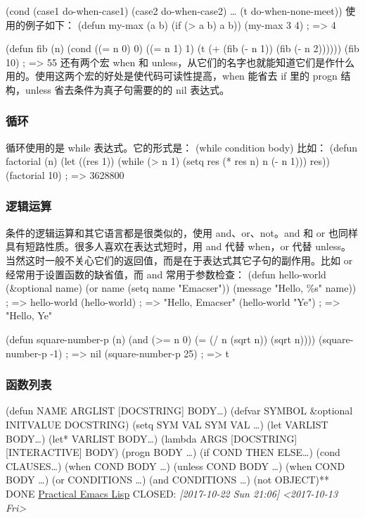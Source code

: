 \documentclass[11pt]{ctexart}
\begin{document}
{{{{(cond (case1 do-when-case1)
(case2 do-when-case2)
\ldots{}
(t do-when-none-meet))
使用的例子如下：
(defun my-max (a b)
(if (> a b)
a b))
(my-max 3 4)                            ; => 4

(defun fib (n)
(cond ((= n 0) 0)
((= n 1) 1)
(t (+ (fib (- n 1))
(fib (- n 2))))))
(fib 10)                                ; => 55
还有两个宏 when 和 unless，从它们的名字也就能知道它们是作什么用的。使用这两个宏的好处是使代码可读性提高，when 能省去 if 里的 progn 结构，unless 省去条件为真子句需要的的 nil 表达式。
\subsubsection{循环}
\label{sec:org49a4fb9}
循环使用的是 while 表达式。它的形式是：
(while condition
body)
比如：
(defun factorial (n)
(let ((res 1))
(while (> n 1)
(setq res (* res n)
n (- n 1)))
res))
(factorial 10)                          ; => 3628800
\subsubsection{逻辑运算}
\label{sec:orgdbb320c}
条件的逻辑运算和其它语言都是很类似的，使用 and、or、not。and 和 or 也同样具有短路性质。很多人喜欢在表达式短时，用 and 代替 when，or 代替 unless。当然这时一般不关心它们的返回值，而是在于表达式其它子句的副作用。比如 or 经常用于设置函数的缺省值，而 and 常用于参数检查：
(defun hello-world (\&optional name)
(or name (setq name "Emacser"))
(message "Hello, \%s" name))           ; => hello-world
(hello-world)                           ; => "Hello, Emacser"
(hello-world "Ye")                      ; => "Hello, Ye"

(defun square-number-p (n)
(and (>= n 0)
(= (/ n (sqrt n)) (sqrt n))))
(square-number-p -1)                    ; => nil
(square-number-p 25)                    ; => t
\subsubsection{函数列表}
\label{sec:org0c61e60}
(defun NAME ARGLIST [DOCSTRING] BODY\ldots{})
(defvar SYMBOL \&optional INITVALUE DOCSTRING)
(setq SYM VAL SYM VAL \ldots{})
(let VARLIST BODY\ldots{})
(let* VARLIST BODY\ldots{})
(lambda ARGS [DOCSTRING] [INTERACTIVE] BODY)
(progn BODY \ldots{})
(if COND THEN ELSE\ldots{})
(cond CLAUSES\ldots{})
(when COND BODY \ldots{})
(unless COND BODY \ldots{})
(when COND BODY \ldots{})
(or CONDITIONS \ldots{})
(and CONDITIONS \ldots{})
(not OBJECT)** DONE \href{http://ergoemacs.org/emacs/elisp.html}{Practical Emacs Lisp}
CLOSED: \textit{[2017-10-22 Sun 21:06]}
\textit{<2017-10-13 Fri>}
}}}}
\end{document}
